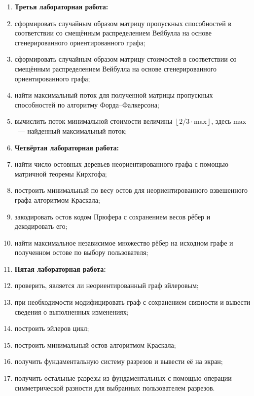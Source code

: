 \begin{enumerate}
    \vspace{1em}
    \item[] \textbf{Третья лабораторная работа:}
    \item сформировать случайным образом матрицу пропускных способностей в соответствии со смещённым распределением Вейбулла на основе сгенерированного ориентированного графа;
    \item сформировать случайным образом матрицу стоимостей в соответствии со смещённым распределением Вейбулла на основе сгенерированного ориентированного графа;
    \item найти максимальный поток для полученной матрицы пропускных способностей по алгоритму Форда--Фалкерсона;
    \item вычислить поток минимальной стоимости величины $\left\lfloor 2 / 3 \cdot \text{max} \right\rfloor$, здесь $\text{max}$~--- найденный максимальный поток;

    \vspace{1em}
    \item[] \textbf{Четвёртая лабораторная работа:}
    \item найти число остовных деревьев неориентированного графа с помощью матричной теоремы Кирхгофа;
    \item построить минимальный по весу остов для неориентированного взвешенного графа алгоритмом Краскала;
    \item закодировать остов кодом Прюфера с сохранением весов рёбер и декодировать его;
    \item найти максимальное независимое множество рёбер на исходном графе и полученном остове по выбору пользователя;

    \vspace{1em}
    \item[] \textbf{Пятая лабораторная работа:}
    \item проверить, является ли неориентированный граф эйлеровым;
    \item при необходимости модифицировать граф с сохранением связности и вывести сведения о выполненных изменениях;
    \item построить эйлеров цикл;
    \item построить минимальный остов алгоритмом Краскала;
    \item получить фундаментальную систему разрезов и вывести её на экран;
    \item получить остальные разрезы из фундаментальных с помощью операции симметрической разности для выбранных пользователем разрезов.
\end{enumerate}
